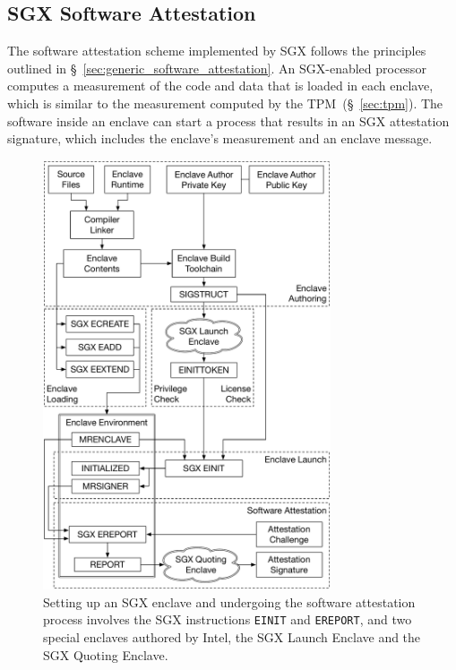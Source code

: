 \subsection{SGX Software Attestation}
\label{sec:sgx_attestation}

The software attestation scheme implemented by SGX follows the principles
outlined in \S~\ref{sec:generic_software_attestation}. An SGX-enabled processor
computes a measurement of the code and data that is loaded in each enclave,
which is similar to the measurement computed by the TPM~(\S~\ref{sec:tpm}). The
software inside an enclave can start a process that results in an SGX
attestation signature, which includes the enclave's measurement and an enclave
message.

\begin{figure}[hbt]
  \centering
  \includegraphics[width=85mm]{figures/sgx_attestation_overview.pdf}
  \caption{
    Setting up an SGX enclave and undergoing the software attestation process
    involves the SGX instructions \texttt{EINIT} and \texttt{EREPORT}, and two
    special enclaves authored by Intel, the SGX Launch Enclave and the SGX
    Quoting Enclave.
  }
  \label{fig:sgx_attestation_overview}
\end{figure}


